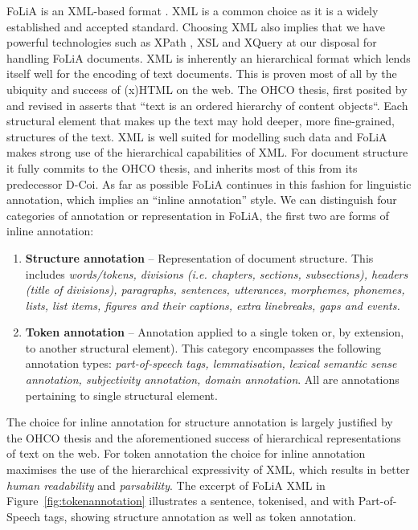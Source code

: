 \documentclass[a4paper,10pt,twoside]{article}
\begin{document}
FoLiA is an XML-based format \cite{XML}. XML is a common choice as it is a widely
established and accepted standard. Choosing XML also implies that we have
powerful technologies such as XPath \cite{XPATH}, XSL \cite{XSL} and XQuery
\cite{XQUERY} at our disposal for handling FoLiA documents. XML is
inherently an hierarchical format which lends itself well for the encoding of
text documents. This is proven most of all by the ubiquity and success of (x)HTML on the web.
The OHCO thesis, first posited by \cite{OHCO1} and revised in \cite{OHCO2}
asserts that ``text is an ordered hierarchy of content objects``. Each
structural element that makes up the text may hold deeper, more fine-grained,
structures of the text. XML is well suited for modelling such data and FoLiA
makes strong use of the hierarchical capabilities of XML. For document
structure it fully commits to the OHCO thesis, and inherits most of this from its
predecessor D-Coi. As far as possible FoLiA continues in this fashion for
linguistic annotation, which implies an ``inline
annotation'' style. We can distinguish four categories of annotation or
representation in FoLiA, the first two are forms of inline annotation:

\begin{enumerate}
\item \textbf{Structure annotation} -- Representation of document structure.
  This includes \emph{words/tokens, divisions (i.e. chapters, sections,
  subsections), headers (title of divisions), paragraphs, sentences,
  utterances, morphemes,
  phonemes, lists,
  list items, figures and their captions, extra linebreaks, gaps and events.}
\item \textbf{Token annotation} -- Annotation applied to a single token or, by
  extension, to another structural element). This category encompasses the
  following annotation types: \emph{part-of-speech tags, lemmatisation, lexical
  semantic sense annotation, subjectivity annotation, domain annotation}. All
  are annotations pertaining to single structural element.
  \setcounter{enumTemptwo}{\theenumi}
\end{enumerate}

The choice for inline annotation for structure annotation is largely justified
by the OHCO thesis and the aforementioned success of hierarchical representations of text on
the web. For token annotation the choice for inline annotation maximises the
use of the hierarchical expressivity of XML, which results in better \emph{human
readability} and \emph{parsability}. The excerpt of FoLiA XML in
Figure~\ref{fig:tokenannotation} illustrates a sentence, tokenised, and with
Part-of-Speech tags, showing structure annotation as well as token annotation.
\end{document}
